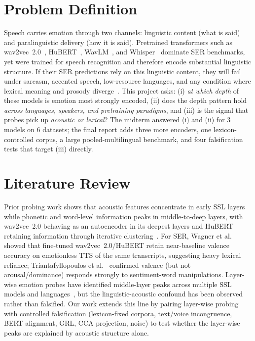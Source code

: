 \documentclass[sigconf,screen]{acmart}
\begin{document}
\section{Problem Definition}
Speech carries emotion through two channels: linguistic content (what is said) and paralinguistic delivery (how it is said). Pretrained transformers such as wav2vec~2.0~\cite{baevski2020wav2vec}, HuBERT~\cite{hsu2021hubert}, WavLM~\cite{chen2022wavlm}, and Whisper~\cite{radford2023robust} dominate SER benchmarks, yet were trained for speech recognition and therefore encode substantial linguistic structure. If their SER predictions rely on this linguistic content, they will fail under sarcasm, accented speech, low-resource languages, and any condition where lexical meaning and prosody diverge~\cite{wagner2023dawn,triantafyllopoulos2022probing}.
This project asks: (i) \emph{at which depth} of these models is emotion most strongly encoded, (ii) does the depth pattern hold \emph{across languages, speakers, and pretraining paradigms}, and (iii) is the signal that probes pick up \emph{acoustic or lexical}? The midterm answered (i) and (ii) for 3 models on 6 datasets; the final report adds three more encoders, one lexicon-controlled corpus, a large pooled-multilingual benchmark, and four falsification tests that target (iii) directly.
\section{Literature Review}
Prior probing work shows that acoustic features concentrate in early SSL layers while phonetic and word-level information peaks in middle-to-deep layers, with wav2vec~2.0 behaving as an autoencoder in its deepest layers and HuBERT retaining information through iterative clustering~\cite{shah2021audio,pasad2021layer,huo2025iterative}. For SER, Wagner et al.~\cite{wagner2023dawn} showed that fine-tuned wav2vec~2.0/HuBERT retain near-baseline valence accuracy on emotionless TTS of the same transcripts, suggesting heavy lexical reliance; Triantafyllopoulos et al.~\cite{triantafyllopoulos2022probing} confirmed valence (but not arousal/dominance) responds strongly to sentiment-word manipulations. Layer-wise emotion probes have identified middle-layer peaks across multiple SSL models and languages~\cite{singh2023decoding,chiu2025probing,han2025crosslingual}, but the linguistic-acoustic confound has been observed rather than falsified. Our work extends this line by pairing layer-wise probing with controlled falsification (lexicon-fixed corpora, text/voice incongruence, BERT alignment, GRL, CCA projection, noise) to test whether the layer-wise peaks are explained by acoustic structure alone.
\end{document}
